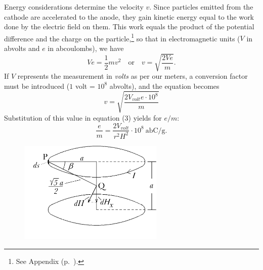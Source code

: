 
Energy considerations determine the velocity $v$. Since particles
emitted from the cathode are accelerated to the anode, they gain kinetic
energy equal to the work done by the electric field on them. This work
equals the product of the potential difference and the charge on the
particle,\footnote{See Appendix (p.~\pageref{ch:appendix}).} so that in electromagnetic
units ($V$ in abvolts and $e$ in abcoulombs), we have
%
\begin{equation}
Ve = \frac{1}{2}mv^2 \quad\text{or}\quad v = \sqrt{\frac{2Ve}{m}}.\label{eq:thomson_4}
\end{equation}
%
If $V$ represents the measurement in \emph{volts} as per our
meters, a conversion factor must be introduced ($1$ volt = $10^8$ abvolts),
and the equation becomes
\begin{equation}
v = \sqrt{\frac{2V_{volt}e\cdot{10^8}}{m}}\label{eq:thomson_5}
\end{equation}
Substitution of this value in equation (3) yields for $e/m$:
\begin{equation}
\frac{e}{m} = \frac{2V_{volt}}{r^2H^2}\cdot 10^8 \:\text{abC/g.}\label{eq:thomson_6}
\end{equation}

\begin{figure}
\centering
    \includegraphics[width=2.72153in,height=1.93056in]{images/02_thomson/image039.png}
\end{figure}


